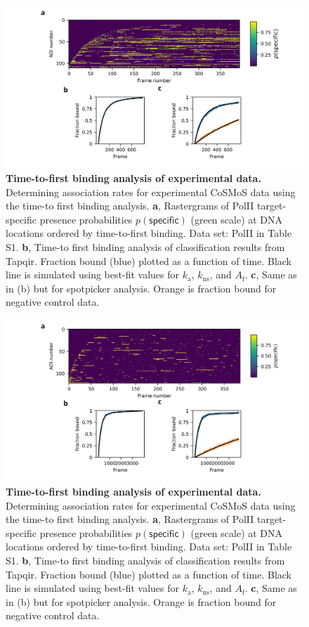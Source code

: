 \begin{figure}[t]
\centering
\includegraphics[width=\textwidth]{extended-data/figure3/figure3.png}
\caption{\textbf{Time-to-first binding analysis of experimental data.}  Determining association rates for experimental CoSMoS data using the time-to first binding analysis. \textbf{a}, Rastergrams of PolII target-specific presence probabilities $p(\mathsf{specific})$ (green scale) at DNA locations ordered by time-to-first binding. Data set: PolII in Table S1. \textbf{b}, Time-to first binding analysis of classification results from Tapqir. Fraction bound (blue) plotted as a function of time. Black line is simulated using best-fit values for $k_\mathrm{a}$, $k_\mathrm{ns}$, and $A_\mathrm{f}$. \textbf{c}, Same as in (b) but for spotpicker analysis. Orange is fraction bound for negative control data.
}
\label{fig:experimental_data}
\end{figure}
\pagebreak

\begin{figure}[t]
\centering
\includegraphics[width=\textwidth]{extended-data/figure4/figure4.png}
\caption{\textbf{Time-to-first binding analysis of experimental data.}  Determining association rates for experimental CoSMoS data using the time-to first binding analysis. \textbf{a}, Rastergrams of PolII target-specific presence probabilities $p(\mathsf{specific})$ (green scale) at DNA locations ordered by time-to-first binding. Data set: PolII in Table S1. \textbf{b}, Time-to first binding analysis of classification results from Tapqir. Fraction bound (blue) plotted as a function of time. Black line is simulated using best-fit values for $k_\mathrm{a}$, $k_\mathrm{ns}$, and $A_\mathrm{f}$. \textbf{c}, Same as in (b) but for spotpicker analysis. Orange is fraction bound for negative control data.
}
\label{fig:experimental_data}
\end{figure}
\clearpage
\pagebreak

